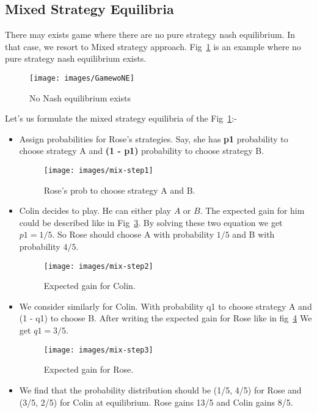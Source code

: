 \subsection{Mixed Strategy Equilibria}

There may exists game where there are no pure strategy nash equilibrium. In that case, we resort to Mixed strategy approach. Fig~\ref{figure9} is an example where no pure strategy nash equilibrium exists.

\begin{figure}[h!]
\centering
\texttt{[image: images/GamewoNE]}
\caption{No Nash equilibrium exists}
\label{figure9}
\end{figure}

Let's us formulate the mixed strategy equilibria of the Fig~\ref{figure9}:-\\
\begin{itemize}
    \item Assign probabilities for Rose's strategies. Say, she has \textbf{p1} probability to choose strategy A and \textbf{(1 - p1)} probability to choose strategy B. 
\begin{figure}[h!]
\centering
\texttt{[image: images/mix-step1]}
\caption{Rose's prob to choose strategy A and B.}
\label{figure10}
\end{figure}
    \item Colin decides to play. He can either play $A$ or $B$. The expected gain for him could be described like in Fig~\ref{figure11}. By solving these two equation we get $p1 = 1/5$. So Rose should choose A with probability $1/5$ and B with probability $4/5$. 
\begin{figure}[h!]
\centering
\texttt{[image: images/mix-step2]}
\caption{Expected gain for Colin.}
\label{figure11}
\end{figure}
    \item We consider similarly for Colin. With probability q1 to choose strategy A and (1 - q1) to choose B. After writing the expected gain for Rose like in fig~\ref{figure12} We get $q1 = 3/5$.
\begin{figure}[h!]
\centering
\texttt{[image: images/mix-step3]}
\caption{Expected gain for Rose.}
\label{figure12}
\end{figure}
    \item We find that the probability distribution should be (1/5, 4/5) for Rose and (3/5, 2/5) for Colin at equilibrium. Rose gains 13/5 and Colin gains 8/5.
\end{itemize}

